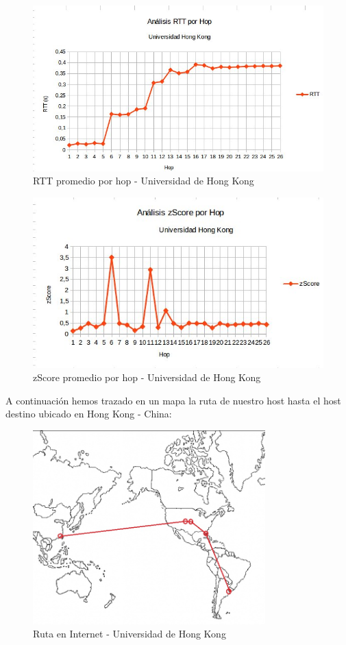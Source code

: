 \begin{figure}[H]
\centering
\includegraphics[width=1\textwidth]{graficos/rTT_HongKong.jpg}
\caption{RTT promedio por hop - Universidad de Hong Kong}
\label{hongkong_rtt}
\end{figure}

\begin{figure}[H]
\centering
\includegraphics[width=1\textwidth]{graficos/zScore_HongKong.jpg}
\caption{zScore promedio por hop - Universidad de Hong Kong}
\label{hongkong_zs}
\end{figure}

A continuación hemos trazado en un mapa la ruta de nuestro host hasta el host destino ubicado en Hong Kong - China:
\begin{figure}[H]
\centering
\includegraphics[width=0.8\textwidth]{graficos/mapa_hongKong.jpg}
\caption{Ruta en Internet - Universidad de Hong Kong}
\label{hongkong_zs}
\end{figure}
